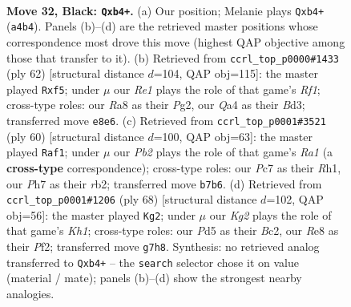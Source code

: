 \documentclass[11pt]{article}
\begin{document}
\clearpage

\begin{figure}[p]\centering
\begin{subfigure}{0.46\textwidth}\centering
\resizebox{\linewidth}{!}{%
\newchessgame
\chessboard[
  setfen={r3r3/1pp3kp/5p2/3p1bb1/qB1K4/N3P3/P2N1P2/R7 b - - 1 32},
  showmover=false,
  pgfstyle=straightmove, color=movearrow, markmove={a4-b4}
]}
\caption{}
\end{subfigure}\hfill
\begin{subfigure}{0.46\textwidth}\centering
\resizebox{\linewidth}{!}{%
\newchessgame
\chessboard[
  setfen={4r3/p5k1/Pp4p1/3q1bQn/3p4/3B4/1P4PP/5RK1 w - - 0 32},
  showmover=false,
  pgfstyle=straightmove, color=movearrow, markmove={f1-f5}
]}
\caption{}
\end{subfigure}
\\[4pt]
\begin{subfigure}{0.46\textwidth}\centering
\resizebox{\linewidth}{!}{%
\newchessgame
\chessboard[
  setfen={5rk1/5p2/2qP2pP/p2pP1Qn/8/2P1B2K/1r6/R6R w - - 0 31},
  showmover=false,
  pgfstyle=straightmove, color=movearrow, markmove={a1-f1}
]}
\caption{}
\end{subfigure}\hfill
\begin{subfigure}{0.46\textwidth}\centering
\resizebox{\linewidth}{!}{%
\newchessgame
\chessboard[
  setfen={4r3/1p4k1/p1p2r2/P4b2/3Qp3/2P4n/1PB2P2/3R3K w - - 0 35},
  showmover=false,
  pgfstyle=straightmove, color=movearrow, markmove={h1-g2}
]}
\caption{}
\end{subfigure}
\caption{\textbf{Move 32, Black: \texttt{Qxb4+}.} (a) Our position; Melanie plays \texttt{Qxb4+} (\texttt{a4b4}). Panels (b)--(d) are the retrieved master positions whose correspondence most drove this move (highest QAP objective among those that transfer to it). (b) Retrieved from \texttt{ccrl\_top\_p0000\#1433} (ply 62) [structural distance $d$=104, QAP obj=115]: the master played \texttt{Rxf5}; under $\mu$ our \emph{Re1} plays the role of that game's \emph{Rf1}; cross-type roles: our \emph{R}a8 as their \emph{P}g2, our \emph{Q}a4 as their \emph{B}d3; transferred move \texttt{e8e6}. (c) Retrieved from \texttt{ccrl\_top\_p0001\#3521} (ply 60) [structural distance $d$=100, QAP obj=63]: the master played \texttt{Raf1}; under $\mu$ our \emph{Pb2} plays the role of that game's \emph{Ra1} (a \textbf{cross-type} correspondence); cross-type roles: our \emph{P}c7 as their \emph{R}h1, our \emph{P}h7 as their \emph{r}b2; transferred move \texttt{b7b6}. (d) Retrieved from \texttt{ccrl\_top\_p0001\#1206} (ply 68) [structural distance $d$=102, QAP obj=56]: the master played \texttt{Kg2}; under $\mu$ our \emph{Kg2} plays the role of that game's \emph{Kh1}; cross-type roles: our \emph{P}d5 as their \emph{B}c2, our \emph{R}e8 as their \emph{P}f2; transferred move \texttt{g7h8}. Synthesis: no retrieved analog transferred to \texttt{Qxb4+} -- the \texttt{search} selector chose it on value (material / mate); panels (b)--(d) show the strongest nearby analogies.}
\label{fig:thought-m63}
\end{figure}
\end{document}
